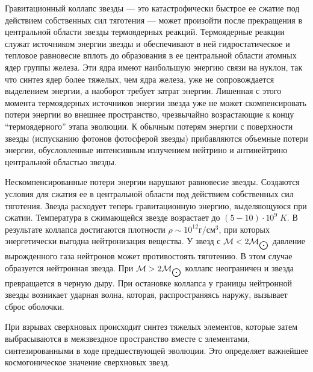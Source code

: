 Гравитационный коллапс звезды --- это катастрофически быстрое ее сжатие
под действием собственных сил тяготения --- может произойти
после прекращения в центральной области звезды термоядерных реакций.
Термоядерные реакции служат источником энергии звезды и обеспечивают
в ней гидростатическое и тепловое равновесие вплоть до образования
в ее центральной области атомных ядер группы железа.
Эти ядра имеют наибольшую энергию связи на нуклон, так что синтез
ядер более тяжелых, чем ядра железа, уже не сопровождается
выделением энергии, а наоборот требует затрат энергии.
Лишенная с этого момента термоядерных источников
энергии звезда уже не может скомпенсировать потери энергии
во внешнее пространство, чрезвычайно возрастающие к концу
``термоядерного'' этапа эволюции.
К обычным потерям энергии с поверхности звезды (испусканию фотонов
фотосферой звезды) прибавляются объемные потери энергии,
обусловленные интенсивным излучением нейтрино и антинейтрино
центральной областью звезды.

Нескомпенсированные потери энергии нарушают равновесие звезды.
Создаются условия для сжатия ее в центральной области
под действием собственных сил тяготения.
Звезда расходует теперь гравитационную энергию, выделяющуюся
при сжатии.
Температура в сжимающейся звезде возрастает до $(5-10)\cdot 10^9\; K$.
В результате коллапса достигаются плотности $\rho\sim 10^{12} г/см^3$,
при которых энергетически выгодна нейтронизация вещества. У звезд с
${\cal M} < 2 {\cal M}_{\bigodot}$ давление вырожденного газа нейтронов может
противостоять тяготению. В этом случае образуется нейтронная звезда.
При ${\cal M} >2 {\cal M}_{\bigodot}$ коллапс неограничен и звезда превращается
в черную дыру. При остановке коллапса у границы нейтронной звезды возникает
ударная волна, которая, распространяясь наружу, вызывает сброс оболочки.

При взрывах сверхновых происходит синтез тяжелых элементов, которые затем
выбрасываются в межзвездное пространство вместе с элементами, синтезированными
в ходе предшествующей эволюции. Это определяет важнейшее космогоническое
значение сверхновых звезд.

